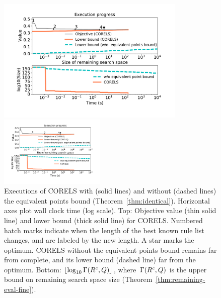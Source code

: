 \begin{figure}[t!]
\begin{center}
\begin{arxiv}
\includegraphics[width=0.8\textwidth]{figs/compas_execution-remaining-space.pdf}
\end{arxiv}
\begin{kdd}
\includegraphics[trim={20mm, 25mm, 20mm, 15mm}, width=0.45\textwidth]{figs/compas_execution-remaining-space.pdf}
\end{kdd}
\end{center}
\caption{Executions of CORELS with (solid lines) and without
(dashed lines) the equivalent points bound (Theorem~\ref{thm:identical}).
%
Horizontal axes plot wall clock time (log scale).
%
Top: Objective value (thin solid line) and lower bound (thick solid line) for CORELS.
%
Numbered hatch marks
indicate when the length of the best known rule list changes,
and are labeled by the new length.
%
A star marks the optimum.
%
CORELS without the equivalent points bound remains far from complete,
and its lower bound (dashed line) far from the optimum.
%
Bottom: $\lfloor \log_{10} \Gamma({R^c}, Q) \rfloor$,
where~$\Gamma({R^c}, Q)$
is the upper bound on remaining search space size
(Theorem~\ref{thm:remaining-eval-fine}).
}
\label{fig:objective}
\end{figure}

